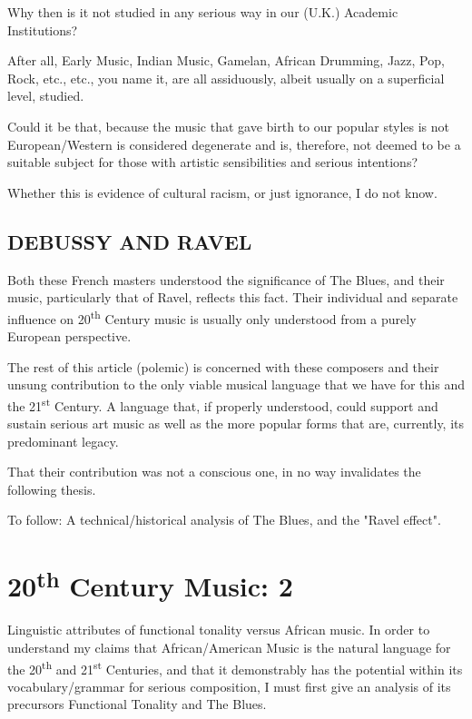 \documentclass{article}
\begin{document}
Why then is it not studied in any serious way in our (U.K.) Academic Institutions?

After all, Early Music, Indian Music, Gamelan, African Drumming, Jazz, Pop, Rock, etc., etc., you name it, are all assiduously, albeit usually on a superficial level, studied.

Could it be that, because the music that gave birth to our popular styles is not European/Western is considered degenerate and is, therefore, not deemed to be a suitable subject for those with artistic sensibilities and serious intentions?

Whether this is evidence of cultural racism, or just ignorance, I do not know.

\subsection{DEBUSSY AND RAVEL}

Both these French masters understood the significance of The Blues, and their music, particularly that of Ravel, reflects this fact.
Their individual and separate influence on 20\textsuperscript{th} Century music is usually only understood from a purely European perspective.

The rest of this article (polemic) is concerned with these composers and their unsung contribution to the only viable musical language that we have for this and the 21\textsuperscript{st} Century.
A language that, if properly understood, could support and sustain serious art music as well as the more popular forms that are, currently, its predominant legacy.

That their contribution was not a conscious one, in no way invalidates the following thesis.

To follow: A technical/historical analysis of The Blues, and the "Ravel effect".

\pagebreak
\section{20\textsuperscript{th} Century Music: 2}

Linguistic attributes of functional tonality versus African music.
In order to understand my claims that African/American Music is the natural language for the 20\textsuperscript{th} and 21\textsuperscript{st} Centuries, and that it demonstrably has the potential within its vocabulary/grammar for serious composition, I must first give an analysis of its precursors Functional Tonality and The Blues.
\end{document}

